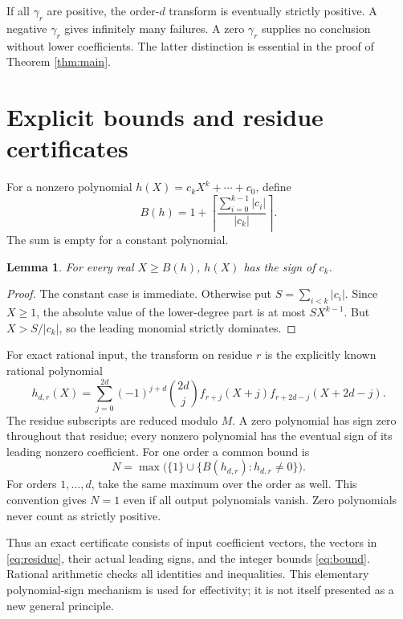 \documentclass[11pt,reqno]{amsart}
\newtheorem{lemma}[theorem]{Lemma}
\theoremstyle{remark}
\begin{document}
If all \(\gamma_r\) are positive, the order-\(d\) transform is eventually
strictly positive. A negative \(\gamma_r\) gives infinitely many failures.
A zero \(\gamma_r\) supplies no conclusion without lower coefficients.
The latter distinction is essential in the proof of Theorem \ref{thm:main}.

\section{Explicit bounds and residue certificates}\label{sec:cert}

For a nonzero polynomial \(h(X)=c_kX^k+\cdots+c_0\), define
\begin{equation}\label{eq:bound}
 B(h)=1+\left\lceil
       \frac{\sum_{i=0}^{k-1}|c_i|}{|c_k|}
       \right\rceil.
\end{equation}
The sum is empty for a constant polynomial.

\begin{lemma}\label{lem:bound}
For every real \(X\ge B(h)\), \(h(X)\) has the sign of \(c_k\).
\end{lemma}
\begin{proof}
The constant case is immediate. Otherwise put \(S=\sum_{i<k}|c_i|\).
Since \(X\ge1\), the absolute value of the lower-degree part is at most
\(SX^{k-1}\). But \(X>S/|c_k|\), so the leading monomial strictly dominates.
\end{proof}

For exact rational input, the transform on residue \(r\) is the explicitly
known rational polynomial
\begin{equation}\label{eq:residue}
 h_{d,r}(X)=\sum_{j=0}^{2d}(-1)^{j+d}\binom{2d}{j}
 f_{r+j}(X+j)f_{r+2d-j}(X+2d-j).
\end{equation}
The residue subscripts are reduced modulo \(M\). A zero polynomial has
sign zero throughout that residue; every nonzero polynomial has the eventual
sign of its leading nonzero coefficient. For one order a common bound is
\[
 N=\max\bigl(\{1\}\cup\{B(h_{d,r}):h_{d,r}\ne0\}\bigr).
\]
For orders \(1,\ldots,d\), take the same maximum over the order as well.
This convention gives \(N=1\) even if all output polynomials vanish.
Zero polynomials never count as strictly positive.

Thus an exact certificate consists of input coefficient vectors, the vectors
in \eqref{eq:residue}, their actual leading signs, and the integer bounds
\eqref{eq:bound}. Rational arithmetic checks all identities and inequalities.
This elementary polynomial-sign mechanism is used for effectivity; it is
not itself presented as a new general principle.
\end{document}
